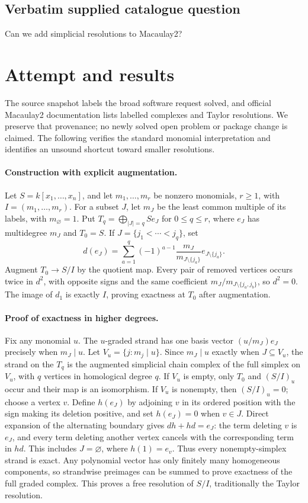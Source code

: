 \documentclass[11pt]{article}
\begin{document}
\subsection{Verbatim supplied catalogue question}
Can we add simplicial resolutions to Macaulay2?

\section{Attempt and results}
The source snapshot labels the broad software request solved, and official
Macaulay2 documentation lists labelled complexes and Taylor resolutions.
We preserve that provenance; no newly solved open problem or package change
is claimed. The following verifies the standard monomial interpretation and
identifies an unsound shortcut toward smaller resolutions.

\paragraph{Construction with explicit augmentation.}
Let $S=k[x_1,\ldots,x_n]$, and let $m_1,\ldots,m_r$ be nonzero monomials,
$r\ge1$, with $I=(m_1,\ldots,m_r)$. For a subset $J$, let $m_J$ be the
least common multiple of its labels, with $m_\varnothing=1$.
Put $T_q=\bigoplus_{|J|=q}S e_J$ for $0\le q\le r$, where $e_J$ has
multidegree $m_J$ and $T_0=S$. If $J=\{j_1<\cdots<j_q\}$, set
\[
d(e_J)=\sum_{a=1}^q(-1)^{a-1}\frac{m_J}{m_{J\setminus\{j_a\}}}
 e_{J\setminus\{j_a\}}.
\]
Augment $T_0\to S/I$ by the quotient map. Every pair of removed vertices
occurs twice in $d^2$, with opposite signs and the same coefficient
$m_J/m_{J\setminus\{j_a,j_b\}}$, so $d^2=0$. The image of $d_1$ is
exactly $I$, proving exactness at $T_0$ after augmentation.

\paragraph{Proof of exactness in higher degrees.}
Fix any monomial $u$. The $u$-graded strand has one basis vector
$(u/m_J)e_J$ precisely when $m_J\mid u$. Let
$V_u=\{j:m_j\mid u\}$. Since $m_J\mid u$ exactly when $J\subseteq V_u$,
the strand on the $T_q$ is the augmented simplicial chain complex of the
full simplex on $V_u$, with $q$ vertices in homological degree $q$.
If $V_u$ is empty, only $T_0$ and $(S/I)_u$ occur and their map is an
isomorphism. If $V_u$ is nonempty, then $(S/I)_u=0$; choose a vertex $v$.
Define $h(e_J)$ by adjoining $v$ in its ordered position with the sign making
its deletion positive, and set $h(e_J)=0$ when $v\in J$. Direct expansion
of the alternating boundary gives $dh+hd=e_J$: the term deleting $v$ is
$e_J$, and every term deleting another vertex cancels with the corresponding
term in $hd$. This includes $J=\varnothing$, where $h(1)=e_v$.
Thus every nonempty-simplex strand is exact. Any polynomial vector has only
finitely many homogeneous components, so strandwise preimages can be summed
to prove exactness of the full graded complex. This proves a free resolution
of $S/I$, traditionally the Taylor resolution.
\end{document}
